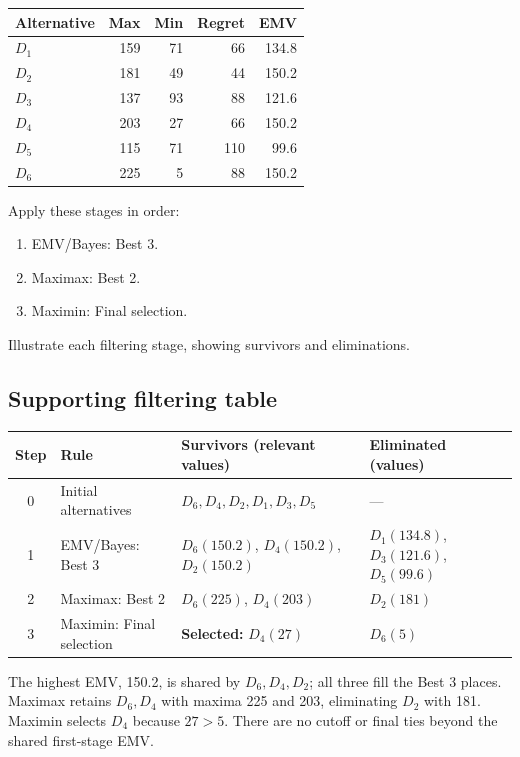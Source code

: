 \vspace{-3mm}
\begin{center}\small\setlength{\tabcolsep}{4pt}
	\begin{tabular}{lrrrr}\toprule
		Alternative & Max & Min & Regret & EMV\\ \midrule
		$D_1$ & 159 & 71 & 66 & 134.8\\
		$D_2$ & 181 & 49 & 44 & 150.2\\
		$D_3$ & 137 & 93 & 88 & 121.6\\
		$D_4$ & 203 & 27 & 66 & 150.2\\
		$D_5$ & 115 & 71 & 110 & 99.6\\
		$D_6$ & 225 & 5 & 88 & 150.2\\
		\bottomrule
	\end{tabular}
\end{center}
\vspace{-3mm}

Apply these stages in order:
\begin{enumerate}[leftmargin=*]
	\item EMV/Bayes: Best 3.
	\item Maximax: Best 2.
	\item Maximin: Final selection.
\end{enumerate}
Illustrate each filtering stage, showing survivors and eliminations.
\label{sol:q3table}
\subsection*{Supporting filtering table}
\begin{center}\small
\begin{tabularx}{\textwidth}{@{}c >{\raggedright\arraybackslash}p{} >{\raggedright\arraybackslash}X >{\raggedright\arraybackslash}p{}@{}}
\toprule
Step & Rule & Survivors (relevant values) & Eliminated (values)\\\midrule
0 & Initial alternatives & $D_6,D_4,D_2,D_1,D_3,D_5$ & ---\\
1 & EMV/Bayes: Best 3 & $D_6(150.2)$, $D_4(150.2)$, $D_2(150.2)$ & $D_1(134.8)$, $D_3(121.6)$, $D_5(99.6)$\\
2 & Maximax: Best 2 & $D_6(225)$, $D_4(203)$ & $D_2(181)$\\
3 & Maximin: Final selection & \textbf{Selected:} $D_4(27)$ & $D_6(5)$\\
\bottomrule\end{tabularx}
\end{center}
The highest EMV, 150.2, is shared by $D_6,D_4,D_2$; all three fill the Best 3 places. Maximax retains $D_6,D_4$ with maxima 225 and 203, eliminating $D_2$ with 181. Maximin selects $D_4$ because $27>5$. There are no cutoff or final ties beyond the shared first-stage EMV.
\secInicio[sec:q3]
\clearpage
{}\label{sol:q3tree}
